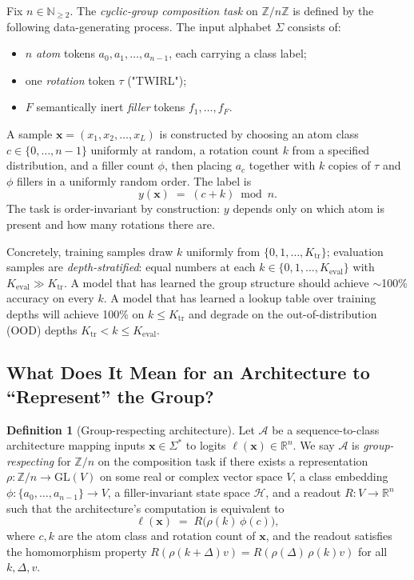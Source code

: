\documentclass[11pt]{article}
\theoremstyle{definition}
\newtheorem{definition}[theorem]{Definition}
\newcommand{\R}{\mathbb{R}}
\newcommand{\Z}{\mathbb{Z}}
\newcommand{\N}{\mathbb{N}}
\begin{document}
Fix $n \in \N_{\geq 2}$. The \emph{cyclic-group composition task} on
$\Z/n\Z$ is defined by the following data-generating process. The
input alphabet $\Sigma$ consists of:
\begin{itemize}[itemsep=2pt]
\item $n$ \emph{atom} tokens $a_0, a_1, \ldots, a_{n-1}$, each carrying
a class label;
\item one \emph{rotation} token $\tau$ ("TWIRL");
\item $F$ semantically inert \emph{filler} tokens $f_1, \ldots, f_F$.
\end{itemize}
A sample $\mathbf{x} = (x_1, x_2, \ldots, x_L)$ is constructed by
choosing an atom class $c \in \{0, \ldots, n-1\}$ uniformly at random,
a rotation count $k$ from a specified distribution, and a filler count
$\phi$, then placing $a_c$ together with $k$ copies of $\tau$ and
$\phi$ fillers in a uniformly random order. The label is
\[
y(\mathbf{x}) \;=\; (c + k) \bmod n.
\]
The task is order-invariant by construction: $y$ depends only on
which atom is present and how many rotations there are.

Concretely, training samples draw $k$ uniformly from
$\{0, 1, \ldots, K_\text{tr}\}$; evaluation samples are
\emph{depth-stratified}: equal numbers at each $k \in
\{0, 1, \ldots, K_\text{eval}\}$ with $K_\text{eval} \gg K_\text{tr}$.
A model that has learned the group structure should achieve
$\sim$100\% accuracy on every $k$. A model that has learned a
lookup table over training depths will achieve 100\% on
$k \leq K_\text{tr}$ and degrade on the out-of-distribution (OOD)
depths $K_\text{tr} < k \leq K_\text{eval}$.

\subsection{What Does It Mean for an Architecture to ``Represent'' the Group?}

\begin{definition}[Group-respecting architecture]
\label{def:group-respecting}
Let $\mathcal{A}$ be a sequence-to-class architecture mapping inputs
$\mathbf{x} \in \Sigma^*$ to logits $\ell(\mathbf{x}) \in \R^n$. We
say $\mathcal{A}$ is \emph{group-respecting} for $\Z/n$ on the
composition task if there exists a representation $\rho: \Z/n \to
\mathrm{GL}(V)$ on some real or complex vector space $V$, a class
embedding $\phi: \{a_0, \ldots, a_{n-1}\} \to V$, a filler-invariant
state space $\mathcal{H}$, and a readout $R: V \to \R^n$ such that
the architecture's computation is equivalent to
\begin{equation}
\label{eq:group-respecting}
\ell(\mathbf{x}) \;=\; R\bigl( \rho(k)\, \phi(c) \bigr),
\end{equation}
where $c, k$ are the atom class and rotation count of $\mathbf{x}$,
and the readout satisfies the homomorphism property
$R(\rho(k+\Delta) v) = R(\rho(\Delta)\, \rho(k) v)$ for all
$k, \Delta, v$.
\end{definition}
\end{document}
